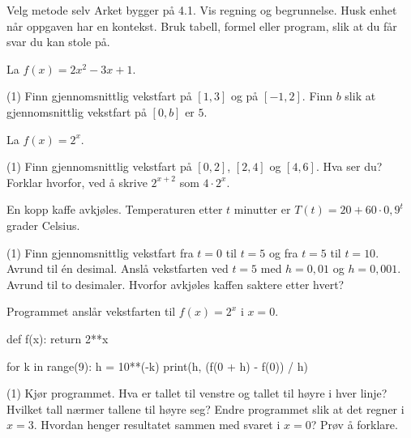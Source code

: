 
\begin{infoboks}{Velg metode selv}
Arket bygger på 4.1. Vis regning og begrunnelse. Husk enhet når oppgaven har en kontekst.
Bruk tabell, formel eller program, slik at du får svar du kan stole på.
\end{infoboks}


La $f(x) = 2x^2 - 3x + 1$.
\begin{tasks}(1)
  \task Finn gjennomsnittlig vekstfart på $[1, 3]$ og på $[-1, 2]$.
  \task Finn $b$ slik at gjennomsnittlig vekstfart på $[0, b]$ er $5$.
\end{tasks}

La $f(x) = 2^x$.
\begin{tasks}(1)
  \task Finn gjennomsnittlig vekstfart på $[0, 2]$, $[2, 4]$ og $[4, 6]$.
  \task Hva ser du? Forklar hvorfor, ved å skrive $2^{x+2}$ som $4 \cdot 2^x$.
\end{tasks}

En kopp kaffe avkjøles. Temperaturen etter $t$ minutter er $T(t) = 20 + 60 \cdot 0,9^t$ grader Celsius.
\begin{tasks}(1)
  \task Finn gjennomsnittlig vekstfart fra $t = 0$ til $t = 5$ og fra $t = 5$ til $t = 10$. Avrund til én desimal.
  \task Anslå vekstfarten ved $t = 5$ med $h = 0,01$ og $h = 0,001$. Avrund til to desimaler.
  \task Hvorfor avkjøles kaffen saktere etter hvert?
\end{tasks}

Programmet anslår vekstfarten til $f(x) = 2^x$ i $x = 0$.
\begin{kode}
def f(x):
    return 2**x

for k in range(9):
    h = 10**(-k)
    print(h, (f(0 + h) - f(0)) / h)
\end{kode}
\begin{tasks}(1)
  \task Kjør programmet. Hva er tallet til venstre og tallet til høyre i hver linje?
  \task Hvilket tall nærmer tallene til høyre seg?
  \task Endre programmet slik at det regner i $x = 3$. Hvordan henger resultatet sammen med svaret i $x = 0$? Prøv å forklare.
\end{tasks}


